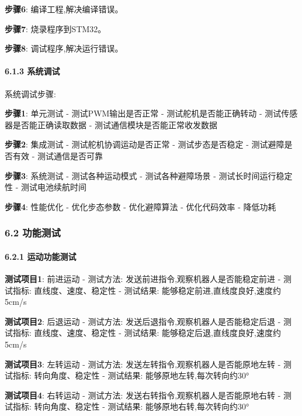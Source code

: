 \documentclass[
]{article}
\begin{document}
\textbf{步骤6}: 编译工程,解决编译错误。

\textbf{步骤7}: 烧录程序到STM32。

\textbf{步骤8}: 调试程序,解决运行错误。

\hypertarget{ux7cfbux7edfux8c03ux8bd5}{%
\paragraph{6.1.3 系统调试}\label{ux7cfbux7edfux8c03ux8bd5}}

系统调试步骤:

\textbf{步骤1}: 单元测试 - 测试PWM输出是否正常 - 测试舵机是否能正确转动
- 测试传感器是否能正确读取数据 - 测试通信模块是否能正常收发数据

\textbf{步骤2}: 集成测试 - 测试舵机协调运动是否正常 - 测试步态是否稳定 -
测试避障是否有效 - 测试通信是否可靠

\textbf{步骤3}: 系统测试 - 测试各种运动模式 - 测试各种避障场景 -
测试长时间运行稳定性 - 测试电池续航时间

\textbf{步骤4}: 性能优化 - 优化步态参数 - 优化避障算法 - 优化代码效率 -
降低功耗

\hypertarget{ux529fux80fdux6d4bux8bd5}{%
\subsubsection{6.2 功能测试}\label{ux529fux80fdux6d4bux8bd5}}

\hypertarget{ux8fd0ux52a8ux529fux80fdux6d4bux8bd5}{%
\paragraph{6.2.1
运动功能测试}\label{ux8fd0ux52a8ux529fux80fdux6d4bux8bd5}}

\textbf{测试项目1}: 前进运动 - 测试方法:
发送前进指令,观察机器人是否能稳定前进 - 测试指标: 直线度、速度、稳定性 -
测试结果: 能够稳定前进,直线度良好,速度约5cm/s

\textbf{测试项目2}: 后退运动 - 测试方法:
发送后退指令,观察机器人是否能稳定后退 - 测试指标: 直线度、速度、稳定性 -
测试结果: 能够稳定后退,直线度良好,速度约5cm/s

\textbf{测试项目3}: 左转运动 - 测试方法:
发送左转指令,观察机器人是否能原地左转 - 测试指标: 转向角度、稳定性 -
测试结果: 能够原地左转,每次转向约30°

\textbf{测试项目4}: 右转运动 - 测试方法:
发送右转指令,观察机器人是否能原地右转 - 测试指标: 转向角度、稳定性 -
测试结果: 能够原地右转,每次转向约30°
\end{document}
